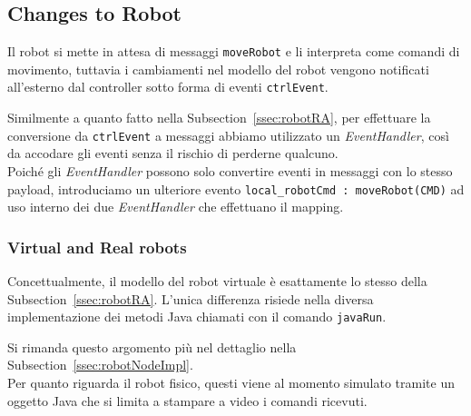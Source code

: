 \documentclass{../llncs}
\newcommand{\codescript}[1]{{\mbox{\small{\texttt{#1}}}}\xspace}
\newcommand{\labelssec}[1]{\label{ssec:#1}}
\newcommand{\xss}[1]{\subsectionname~\ref{ssec:#1}}
\newcommand{\subsectionname}{Subsection}
\begin{document}


\subsection{Changes to Robot}
Il robot si mette in attesa di messaggi \codescript{moveRobot} e li interpreta come comandi di movimento, tuttavia i cambiamenti nel modello del robot vengono notificati all'esterno dal controller sotto forma di eventi \codescript{ctrlEvent}.

Similmente a quanto fatto nella \xss{robotRA}, per effettuare la conversione da \codescript{ctrlEvent} a messaggi abbiamo utilizzato un \emph{EventHandler}, così da accodare gli eventi senza il rischio di perderne qualcuno.\\ %



Poiché gli \emph{EventHandler} possono solo convertire eventi in messaggi con lo stesso payload, introduciamo un ulteriore evento \codescript{local\_robotCmd : moveRobot(CMD)} ad uso interno dei due \emph{EventHandler} che effettuano il mapping.

%

\subsubsection{Virtual and Real robots}
\labelssec{virtualRobotPA}
Concettualmente, il modello del robot virtuale è esattamente lo stesso della \xss{robotRA}. L'unica differenza risiede nella diversa implementazione dei metodi Java chiamati con il comando \codescript{javaRun}.

Si rimanda questo argomento più nel dettaglio nella \xss{robotNodeImpl}.\\

Per quanto riguarda il robot fisico, questi viene al momento simulato tramite un oggetto Java che si limita a stampare a video i comandi ricevuti.
\end{document}
